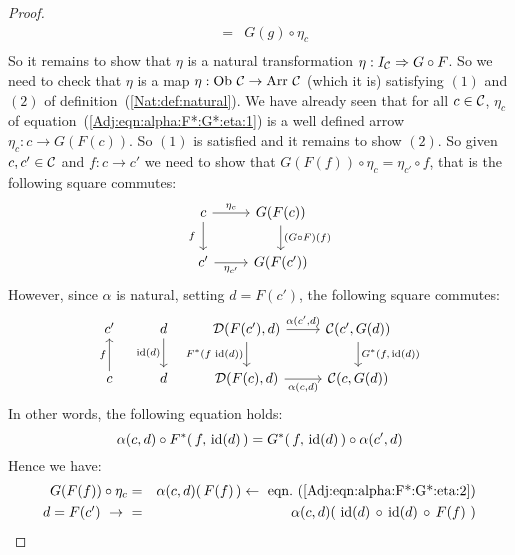 \begin{proof}
\begin{eqnarray*}
            &=&G(g)\circ\eta_{c}\\
        \end{eqnarray*}
    So it remains to show that $\eta$ is a natural transformation 
    $\eta:I_{\cal C}\Rightarrow G\circ F$. So we need to check that 
    $\eta$ is a map $\eta:\mbox{\rm Ob}\ \mbox{$\cal C$}\to\mbox{\rm Arr}\ \mbox{$\cal C$}$ (which it is) satisfying
    $(1)$ and $(2)$ of definition~(\ref{Nat:def:natural}). We have already
    seen that for all $c\in\mbox{$\cal C$}$, $\eta_{c}$ of
    equation~(\ref{Adj:eqn:alpha:F*:G*:eta:1}) is a well defined arrow
    $\eta_{c}:c\to G(F(c))$. So $(1)$ is satisfied and it remains to show $(2)$.
    So given $c,c'\in\mbox{$\cal C$}$ and $f:c\to c'$ we need to show that
    $G(F(f))\circ\eta_{c}=\eta_{c'}\circ f$, that is the following 
    square commutes:
        \[
            \begin{tikzcd}
                c\arrow[r, "\eta_{c}"]\arrow[d, swap,"f\ "]
                &G(F(c))\arrow[d, "(G\circ F)(f)"]
                \\
                c'\arrow[r, swap, "\eta_{c'}"]
                &G(F(c'))
            \end{tikzcd}
        \]
    However, since $\alpha$ is natural, setting $d=F(c')$, the following
    square commutes:
        \[
            \begin{tikzcd}
                c'
                &d\arrow[d,swap, "{\rm id}(d)"]
                &\Dat(F(c'),d)\arrow[r, "\alpha\mbox{$(c',d)$}"]
                \arrow[d, swap,"F^{*}\mbox{$(f\,\,{\rm id}(d))$}"]
                &\Cat(c',G(d))
                \arrow[d, "G^{*}\mbox{$(f,\,{\rm id}(d))$}"]
                \\
                c\arrow[u, "f"]
                &d
                &\Dat(F(c),d)\arrow[r, swap, "\alpha\mbox{$(c,d)$}"]
                &\Cat(c,G(d))
            \end{tikzcd}
        \]
    In other words, the following equation holds:
        \begin{equation}\label{Adj:eqn:alpha:F*:G*:eta:4}
            \alpha(c,d)\circ F^{*}(\,f,\,\mbox{\rm id}(d)\,) = G^{*}(\,f,\,\mbox{\rm id}(d)\,)\circ\alpha(c',d)
        \end{equation}
    Hence we have: 
        \begin{eqnarray*}G(F(f))\circ\eta_{c}
            &=&\alpha(c,d)(\,F(f)\,)
            \leftarrow\ \mbox{eqn.~(\ref{Adj:eqn:alpha:F*:G*:eta:2})}\\
            \mbox{$d=F(c')$}\ \to\ 
            &=&\alpha(c,d)(\ \id(d)\,\circ\,\id(d)\,\circ\,F(f)\ )\\

\end{eqnarray*}
\end{proof}
